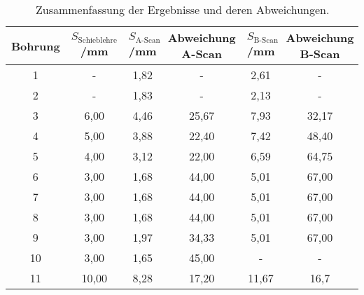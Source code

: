 \begin{table}[H]
  \centering
  \caption{Zusammenfassung der Ergebnisse und deren Abweichungen.}
  \label{tab:tab4}
    \begin{tabular}{c c c c c c}
    \toprule
    Bohrung & $S_{\text{Schieblehre}}$/\;mm & $S_{\text{A-Scan}}$/\;mm
    &Abweichung A-Scan & $S_{\text{B-Scan}}$/\;mm & Abweichung B-Scan\\
    \midrule
    1 &-     & 1,82 & -   & 2,61 & -\\
    2 & -    & 1,83& -    & 2,13 & -\\
    3 & 6,00& 4,46& 25,67 & 7,93 & 32,17\\
    4& 5,00 & 3,88& 22,40 &7,42 & 48,40\\
    5 & 4,00& 3,12& 22,00 & 6,59 & 64,75\\
    6 & 3,00& 1,68& 44,00 & 5,01 & 67,00\\
    7&  3,00& 1,68& 44,00 & 5,01 & 67,00\\
    8 & 3,00& 1,68& 44,00 & 5,01 & 67,00\\
    9 & 3,00& 1,97& 34,33 & 5,01 & 67,00\\
    10 & 3,00& 1,65 &45,00 &-   &  -\\
    11 & 10,00& 8,28& 17,20 &11,67 & 16,7\\
    \bottomrule
    \end{tabular}
  \end{table}
